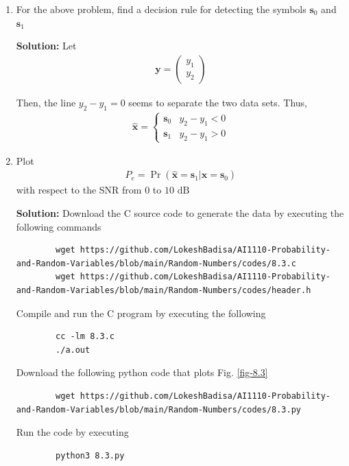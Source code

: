 \documentclass[journal,12pt,twocolumn]{IEEEtran}
\newcommand{\solution}{\noindent \textbf{Solution: }}
\providecommand{\pr}[1]{\ensuremath{\Pr\left(#1\right)}}
\providecommand{\mbf}{\mathbf}
\let\vec\mathbf
\numberwithin{equation}{section}
\renewcommand\thesection{\arabic{section}}
\newcommand{\myvec}[1]{\ensuremath{\begin{pmatrix}#1\end{pmatrix}}}
\begin{document}
\begin{enumerate}[label=\thesection.\arabic*,ref=\thesection.\theenumi]
	\item For the above problem, find a decision rule for detecting the symbols $\mbf{s}_0 $ and $\mbf{s}_1$
	
	\solution Let
	\begin{align}
		\vec{y} = \myvec{y_1 \\ y_2}
	\end{align}
	
	Then, the line $y_2 - y_1 = 0$ seems to separate the two data sets. Thus,
	\begin{align}
		\hat{\vec{x}} = 
		\begin{cases}
			\vec{s}_0 & y_2 - y_1 < 0 \\
			\vec{s}_1 & y_2 - y_1 > 0
		\end{cases}
	\end{align}
	
	\item Plot 
	\begin{align} 
		P_e = \pr{\hat{\vec{x}} = \vec{s}_1|\vec{x} = \vec{s}_0}
	\end{align}
	with respect to the SNR from $0$ to $10$ $\mathrm{dB}$
	
	\solution Download the C source code to generate the data by executing the following commands
	\begin{lstlisting}
		wget https://github.com/LokeshBadisa/AI1110-Probability-and-Random-Variables/blob/main/Random-Numbers/codes/8.3.c
		wget https://github.com/LokeshBadisa/AI1110-Probability-and-Random-Variables/blob/main/Random-Numbers/codes/header.h
	\end{lstlisting}
	Compile and run the C program by executing the following
	\begin{lstlisting}
		cc -lm 8.3.c
		./a.out
	\end{lstlisting}
	
	Download the following python code that plots Fig. \ref{fig-8.3} 
	\begin{lstlisting}
		wget https://github.com/LokeshBadisa/AI1110-Probability-and-Random-Variables/blob/main/Random-Numbers/codes/8.3.py
	\end{lstlisting}
	Run the code by executing
	\begin{lstlisting}
		python3 8.3.py
	\end{lstlisting}
	

\end{enumerate}
\end{document}
